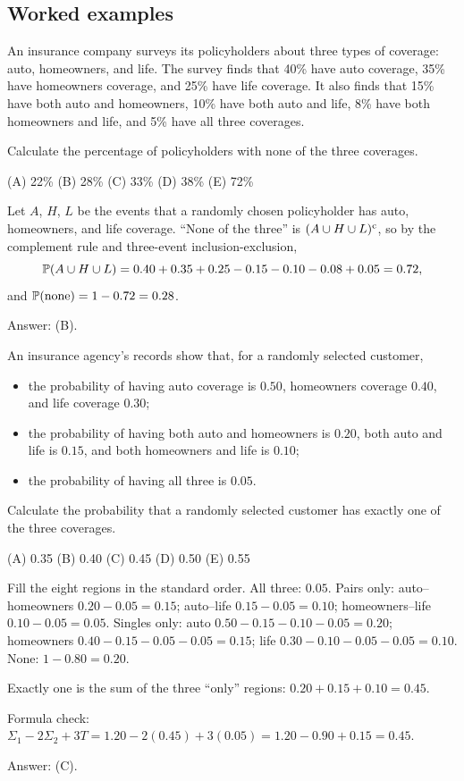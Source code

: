 \subsection{Worked examples}

\begin{example}
An insurance company surveys its policyholders about three types of coverage:
auto, homeowners, and life. The survey finds that 40\% have auto coverage, 35\%
have homeowners coverage, and 25\% have life coverage. It also finds that 15\%
have both auto and homeowners, 10\% have both auto and life, 8\% have both
homeowners and life, and 5\% have all three coverages.

Calculate the percentage of policyholders with none of the three coverages.

(A) 22\% \quad (B) 28\% \quad (C) 33\% \quad (D) 38\% \quad (E) 72\%
\end{example}
\begin{solution}
Let $A$, $H$, $L$ be the events that a randomly chosen policyholder has auto,
homeowners, and life coverage. ``None of the three'' is $(A\cup H\cup L)^{\mathrm{c}}$, so
by the complement rule and three-event inclusion-exclusion,
\[
  \mathbb{P}(A \cup H \cup L) = 0.40 + 0.35 + 0.25 - 0.15 - 0.10 - 0.08 + 0.05 = 0.72,
\]
and $\mathbb{P}(\text{none}) = 1 - 0.72 = 0.28$.

Answer: (B).
\end{solution}

\begin{example}
An insurance agency's records show that, for a randomly selected customer,
\begin{itemize}[nosep]
  \item the probability of having auto coverage is $0.50$, homeowners coverage
        $0.40$, and life coverage $0.30$;
  \item the probability of having both auto and homeowners is $0.20$, both auto
        and life is $0.15$, and both homeowners and life is $0.10$;
  \item the probability of having all three is $0.05$.
\end{itemize}
Calculate the probability that a randomly selected customer has exactly one of the
three coverages.

(A) 0.35 \quad (B) 0.40 \quad (C) 0.45 \quad (D) 0.50 \quad (E) 0.55
\end{example}
\begin{solution}
Fill the eight regions in the standard order. All three: $0.05$.
Pairs only: auto--homeowners $0.20 - 0.05 = 0.15$; auto--life $0.15 - 0.05 = 0.10$;
homeowners--life $0.10 - 0.05 = 0.05$.
Singles only: auto $0.50 - 0.15 - 0.10 - 0.05 = 0.20$;
homeowners $0.40 - 0.15 - 0.05 - 0.05 = 0.15$; life $0.30 - 0.10 - 0.05 - 0.05 = 0.10$.
None: $1 - 0.80 = 0.20$.

Exactly one is the sum of the three ``only'' regions: $0.20 + 0.15 + 0.10 = 0.45$.

Formula check: $\Sigma_1 - 2\Sigma_2 + 3T = 1.20 - 2(0.45) + 3(0.05) = 1.20 - 0.90 + 0.15 = 0.45$.

Answer: (C).
\end{solution}

